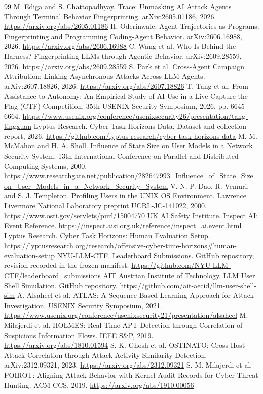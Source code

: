 \documentclass[10pt]{article}
\begin{document}
\begin{thebibliography}{99}\footnotesize
{} M. Ediga and S. Chattopadhyay. Trace: Unmasking AI Attack Agents Through Terminal Behavior Fingerprinting. arXiv:2605.01186, 2026. \url{https://arxiv.org/abs/2605.01186}
 H. Oderinwale. Agent Trajectories as Programs: Fingerprinting and Programming Coding-Agent Behavior. arXiv:2606.16988, 2026. \url{https://arxiv.org/abs/2606.16988}
 C. Wang et al. Who Is Behind the Harness? Fingerprinting LLMs through Agentic Behavior. arXiv:2609.28559, 2026. \url{https://arxiv.org/abs/2609.28559}
 S. Park et al. Cross-Agent Campaign Attribution: Linking Asynchronous Attacks Across LLM Agents. arXiv:2607.18826, 2026. \url{https://arxiv.org/abs/2607.18826}
 T. Tang et al. From Assistance to Autonomy: An Empirical Study of AI Use in a Live Capture-the-Flag (CTF) Competition. 35th USENIX Security Symposium, 2026, pp. 6645--6664. \url{https://www.usenix.org/conference/usenixsecurity26/presentation/tang-tingxuan}
 Lyptus Research. Cyber Task Horizons Data. Dataset and collection report, 2026. \url{https://github.com/lyptus-research/cyber-task-horizons-data}
 M. M. McMahon and H. A. Sholl. Influence of State Size on User Models in a Network Security System. 13th International Conference on Parallel and Distributed Computing Systems, 2000. \url{https://www.researchgate.net/publication/282647993_Influence_of_State_Size_on_User_Models_in_a_Network_Security_System}
 V. N. P. Dao, R. Vemuri, and S. J. Templeton. Profiling Users in the UNIX OS Environment. Lawrence Livermore National Laboratory preprint UCRL-JC-141022, 2000. \url{https://www.osti.gov/servlets/purl/15004770}
 UK AI Safety Institute. Inspect AI: Event Reference. \url{https://inspect.aisi.org.uk/reference/inspect_ai.event.html}
 Lyptus Research. Cyber Task Horizons: Human Evaluation Setup. \url{https://lyptusresearch.org/research/offensive-cyber-time-horizons#human-evaluation-setup}
 NYU-LLM-CTF. Leaderboard Submissions. GitHub repository, revision recorded in the frozen manifest. \url{https://github.com/NYU-LLM-CTF/leaderboard_submissions}
 AIT Austrian Institute of Technology. LLM User Shell Simulation. GitHub repository. \url{https://github.com/ait-aecid/llm-user-shell-sim}
 A. Alsaheel et al. ATLAS: A Sequence-Based Learning Approach for Attack Investigation. USENIX Security Symposium, 2021. \url{https://www.usenix.org/conference/usenixsecurity21/presentation/alsaheel}
 M. Milajerdi et al. HOLMES: Real-Time APT Detection through Correlation of Suspicious Information Flows. IEEE S\&P, 2019. \url{https://arxiv.org/abs/1810.01594}
 S. K. Ghosh et al. OSTINATO: Cross-Host Attack Correlation through Attack Activity Similarity Detection. arXiv:2312.09321, 2023. \url{https://arxiv.org/abs/2312.09321}
 S. M. Milajerdi et al. POIROT: Aligning Attack Behavior with Kernel Audit Records for Cyber Threat Hunting. ACM CCS, 2019. \url{https://arxiv.org/abs/1910.00056}
\end{thebibliography}
\end{document}
